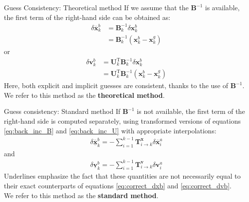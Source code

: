 \documentclass[10pt]{beamer}
\begin{document}
\begin{frame}{Guess Consistency: Theoretical method}
If we assume that the $\mathbf{B}^{-1}$ is available, the first term of the right-hand side can be obtained as:
\begin{align}
\label{eq:correct_dxb}
\delta \overline{\mathbf{x}}^b_k & = \mathbf{B}^{-1}_k \delta \mathbf{x}^b_k \nonumber \\
& = \mathbf{B}^{-1}_k \left(\mathbf{x}^b_k - \mathbf{x}^g_k\right)
\end{align}
or
\begin{align}
\label{eq:correct_dvb}
\delta \mathbf{v}^b_k & = \mathbf{U}_k^\mathrm{T} \mathbf{B}^{-1}_k \delta \mathbf{x}^b_k \nonumber \\
& = \mathbf{U}_k^\mathrm{T} \mathbf{B}^{-1}_k \left(\mathbf{x}^b_k - \mathbf{x}^g_k\right)
\end{align}
Here, both explicit and implicit guesses are consistent, thanks to the use of $\mathbf{B}^{-1}$.\\
\vspace{+0.2cm}
We refer to this method as the \textbf{theoretical method}.
\end{frame}

\begin{frame}{Guess consistency: Standard method}
If $\mathbf{B}^{-1}$ is not available, the first term of the right-hand side is computed separately, using transformed versions of equations \eqref{eq:back_inc_B} and \eqref{eq:back_inc_U} with appropriate interpolations:
\begin{align}
\label{eq:back_inc_Bvar}
\boxed{\delta \underline{\overline{\mathbf{x}}}^b_k = - \sum_{i=1}^{k-1} \mathbf{T}^\mathbf{x}_{i \rightarrow k} \delta \overline{\mathbf{x}}^a_i}
\end{align}
and 
\begin{align}
\label{eq:back_inc_Uvar}
\boxed{\delta \underline{\mathbf{v}}^b_k = - \sum_{i=1}^{k-1} \mathbf{T}^\mathbf{v}_{i \rightarrow k} \delta \mathbf{v}^a_i}
\end{align}
Underlines emphasize the fact that these quantities are not necessarily equal to their exact counterparts of equations \eqref{eq:correct_dxb} and \eqref{eq:correct_dvb}.\\
\vspace{+0.2cm}
We refer to this method as the \textbf{standard method}.
\end{frame}
\end{document}
